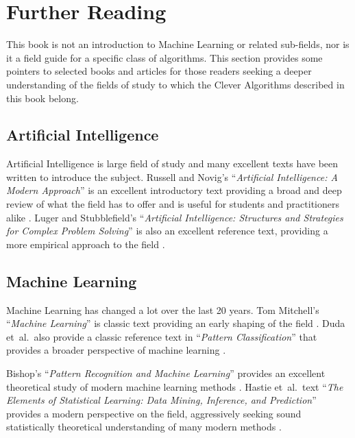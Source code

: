 

\section{Further Reading} 
\label{intro:furtherreading}
This book is not an introduction to Machine Learning or related sub-fields, nor is it a field guide for a specific class of algorithms. This section provides some pointers to selected books and articles for those readers seeking a deeper understanding of the fields of study to which the Clever Algorithms described in this book belong.

\subsection{Artificial Intelligence}
Artificial Intelligence is large field of study and many excellent texts have been written to introduce the subject. Russell and Novig's ``\emph{Artificial Intelligence: A Modern Approach}'' is an excellent introductory text providing a broad and deep review of what the field has to offer and is useful for students and practitioners alike \cite{Russell2009}. Luger and Stubblefield's ``\emph{Artificial Intelligence: Structures and Strategies for Complex Problem Solving}'' is also an excellent reference text, providing a more empirical approach to the field \cite{Luger1993}.

\subsection{Machine Learning}
Machine Learning has changed a lot over the last 20 years. 
Tom Mitchell's ``\emph{Machine Learning}'' is classic text providing an early shaping of the field \cite{Mitchell1997}.
Duda et~al.\ also provide a classic reference text in ``\emph{Pattern Classification}'' that provides a broader perspective of machine learning \cite{Duda2001}.

Bishop's ``\emph{Pattern Recognition and Machine Learning}'' provides an excellent theoretical study of modern machine learning methods \cite{Bishop2007}.
Hastie et~al.\ text ``\emph{The Elements of Statistical Learning: Data Mining, Inference, and Prediction}'' provides a modern perspective on the field, aggressively seeking sound statistically theoretical understanding of many modern methods \cite{Hastie2009}.

